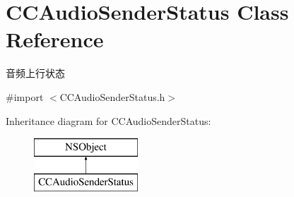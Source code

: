 \hypertarget{interface_c_c_audio_sender_status}{}\section{C\+C\+Audio\+Sender\+Status Class Reference}
\label{interface_c_c_audio_sender_status}


音频上行状态  




{\ttfamily \#import $<$C\+C\+Audio\+Sender\+Status.\+h$>$}

Inheritance diagram for C\+C\+Audio\+Sender\+Status\+:\begin{figure}[H]
\begin{center}
\leavevmode
\includegraphics[height=2.000000cm]{interface_c_c_audio_sender_status}
\end{center}
\end{figure}
